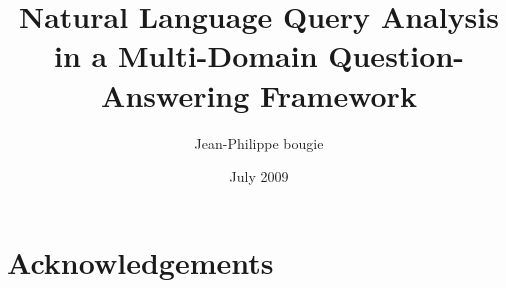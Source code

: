 \documentclass[a4paper]{report}
\begin{document}
\onehalfspacing

\title{Natural Language Query Analysis in a Multi-Domain Question-Answering Framework}
\author{Jean-Philippe bougie}
\date{July 2009}

\maketitle

\tableofcontents
\listoffigures
\listoftables

\chapter*{Acknowledgements}

\begin{abstract}
\end{abstract}





\end{document}
